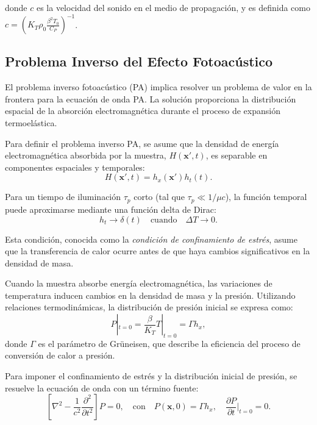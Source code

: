 donde $c$ es la velocidad del sonido en el medio de propagación, y es definida como $c = \left(K_{T}\rho_{0}\frac{\beta^2 T_{0}}{C_{P}}\right)^{-1}$.

\subsection{Problema Inverso del Efecto Fotoacústico}\label{sec:problemaPA}
El problema inverso fotoacústico (PA) implica resolver un problema de valor en la frontera para la ecuación de onda PA. La solución proporciona la distribución espacial de la absorción electromagnética durante el proceso de expansión termoelástica.

Para definir el problema inverso PA, se asume que la densidad de energía electromagnética absorbida por la muestra, $H(\mathbf{x}',t)$, es separable en componentes espaciales y temporales:
\begin{equation}
    H(\mathbf{x}',t) = h_x(\mathbf{x}') h_t(t).
\end{equation}

Para un tiempo de iluminación $\tau_p$ corto (tal que $\tau_p \ll 1/\mu c$), la función temporal puede aproximarse mediante una función delta de Dirac:
\begin{equation}
    h_t \to \delta(t) \quad \text{cuando} \quad \Delta T \to 0.
\end{equation}

Esta condición, conocida como la \textit{condición de confinamiento de estrés}, asume que la transferencia de calor ocurre antes de que haya cambios significativos en la densidad de masa.

Cuando la muestra absorbe energía electromagnética, las variaciones de temperatura inducen cambios en la densidad de masa y la presión. Utilizando relaciones termodinámicas, la distribución de presión inicial se expresa como:
\begin{equation}
    P|_{t=0} = \frac{\beta}{K_T} T|_{t=0} = \Gamma h_x,
\end{equation}
donde $\Gamma$ es el parámetro de Grüneisen, que describe la eficiencia del proceso de conversión de calor a presión.

Para imponer el confinamiento de estrés y la distribución inicial de presión, se resuelve la ecuación de onda con un término fuente:
\begin{equation}
    \left[ \nabla^2 - \frac{1}{c^2} \frac{\partial^2}{\partial t^2} \right] P = 0, \quad \text{con} \quad P(\mathbf{x}, 0) = \Gamma h_x, \quad \frac{\partial P}{\partial t} \Big|_{t=0} = 0.
\end{equation}

